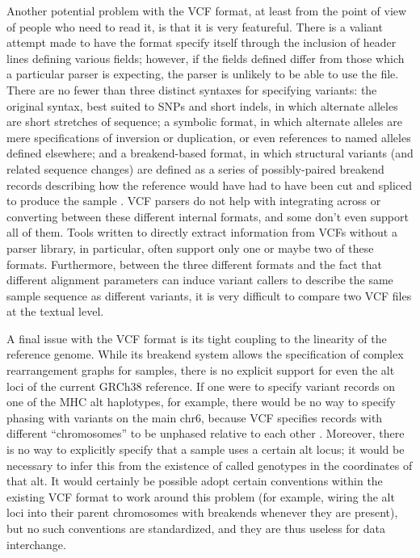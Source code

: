\documentclass[11pt,proposal]{ucthesis}
\begin{document}
Another potential problem with the VCF format, at least from the point of view of people who need to read it, is that it is very featureful. There is a valiant attempt made to have the format specify itself through the inclusion of header lines defining various fields; however, if the fields defined differ from those which a particular parser is expecting, the parser is unlikely to be able to use the file. There are no fewer than three distinct syntaxes for specifying variants: the original syntax, best suited to SNPs and short indels, in which alternate alleles are short stretches of sequence; a symbolic format, in which alternate alleles are mere specifications of inversion or duplication, or even references to named alleles defined elsewhere; and a breakend-based format, in which structural variants (and related sequence changes) are defined as a series of possibly-paired breakend records describing how the reference would have had to have been cut and spliced to produce the sample \cite{marshall2013variant}. VCF parsers do not help with integrating across or converting between these different internal formats, and some don't even support all of them. Tools written to directly extract information from VCFs without a parser library, in particular, often support only one or maybe two of these formats. Furthermore, between the three different formats and the fact that different alignment parameters can induce variant callers to describe the same sample sequence as different variants, it is very difficult to compare two VCF files at the textual level.

A final issue with the VCF format is its tight coupling to the linearity of the reference genome. While its breakend system allows the specification of complex rearrangement graphs for samples, there is no explicit support for even the alt loci of the current GRCh38 reference. If one were to specify variant records on one of the MHC alt haplotypes, for example, there would be no way to specify phasing with variants on the main chr6, because VCF specifies records with different ``chromosomes'' to be unphased relative to each other \cite{marshall2013variant}. Moreover, there is no way to explicitly specify that a sample uses a certain alt locus; it would be necessary to infer this from the existence of called genotypes in the coordinates of that alt. It would certainly be possible adopt certain conventions within the existing VCF format to work around this problem (for example, wiring the alt loci into their parent chromosomes with breakends whenever they are present), but no such conventions are standardized, and they are thus useless for data interchange.
\end{document}
